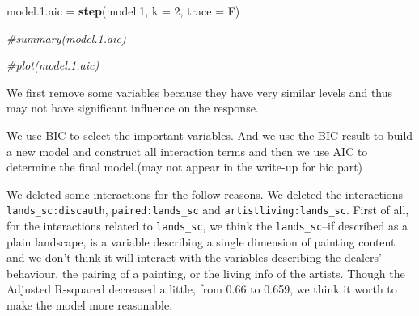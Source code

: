 \documentclass[]{article}
\newenvironment{Shaded}{\begin{snugshade}}{\end{snugshade}}
\newcommand{\CommentTok}[1]{\textcolor[rgb]{0.56,0.35,0.01}{\textit{#1}}}
\newcommand{\DataTypeTok}[1]{\textcolor[rgb]{0.13,0.29,0.53}{#1}}
\newcommand{\DecValTok}[1]{\textcolor[rgb]{0.00,0.00,0.81}{#1}}
\newcommand{\FloatTok}[1]{\textcolor[rgb]{0.00,0.00,0.81}{#1}}
\newcommand{\KeywordTok}[1]{\textcolor[rgb]{0.13,0.29,0.53}{\textbf{#1}}}
\newcommand{\NormalTok}[1]{#1}
\newcommand{\StringTok}[1]{\textcolor[rgb]{0.31,0.60,0.02}{#1}}
\begin{document}
\begin{Shaded}
\begin{Highlighting}[]
\NormalTok{model.}\FloatTok{1.}\NormalTok{aic =}\StringTok{ }\KeywordTok{step}\NormalTok{(model}\FloatTok{.1}\NormalTok{, }\DataTypeTok{k =} \DecValTok{2}\NormalTok{, }\DataTypeTok{trace =}\NormalTok{ F)}

\CommentTok{#summary(model.1.aic)}

\CommentTok{#plot(model.1.aic)}
\end{Highlighting}
\end{Shaded}

We first remove some variables because they have very similar levels and
thus may not have significant influence on the response.

We use BIC to select the important variables. And we use the BIC result
to build a new model and construct all interaction terms and then we use
AIC to determine the final model.(may not appear in the write-up for bic
part)

We deleted some interactions for the follow reasons. We deleted the
interactions \texttt{lands\_sc:discauth}, \texttt{paired:lands\_sc} and
\texttt{artistliving:lands\_sc}. First of all, for the interactions
related to \texttt{lands\_sc}, we think the \texttt{lands\_sc}--if
described as a plain landscape, is a variable describing a single
dimension of painting content and we don't think it will interact with
the variables describing the dealers' behaviour, the pairing of a
painting, or the living info of the artists. Though the Adjusted
R-squared decreased a little, from 0.66 to 0.659, we think it worth to
make the model more reasonable.
\end{document}
